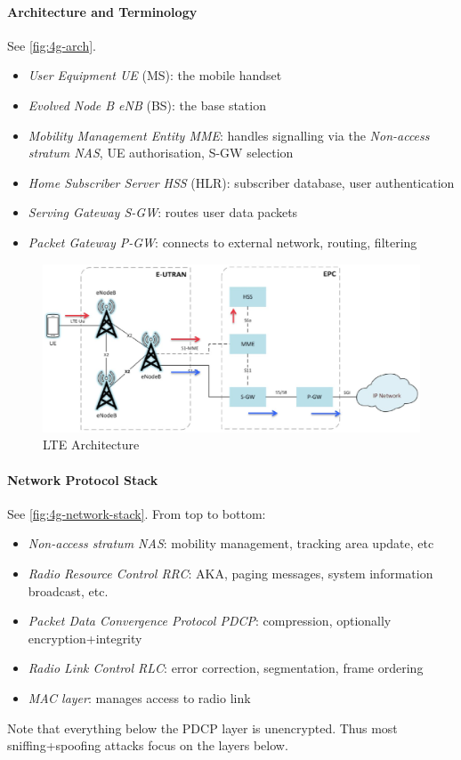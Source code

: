 \paragraph{Architecture and Terminology}
See \autoref{fig:4g-arch}.
\begin{itemize}
	\item \textit{User Equipment UE} (MS): the mobile handset
	\item \textit{Evolved Node B eNB} (BS): the base station
	\item \textit{Mobility Management Entity MME}: handles signalling via the \textit{Non-access stratum NAS}, UE authorisation, S-GW selection
	\item \textit{Home Subscriber Server HSS} (HLR): subscriber database, user authentication
	\item \textit{Serving Gateway S-GW}:  routes user data packets
	\item \textit{Packet Gateway P-GW}: connects to external network, routing, filtering
\end{itemize}

\begin{figure}[h]
	\centering
	\includegraphics[scale=0.5]{images/10-4g-arch.png}
	\caption{LTE Architecture}
	\label{fig:4g-arch}
\end{figure}

\paragraph{Network Protocol Stack}
See \autoref{fig:4g-network-stack}. From top to bottom:
\begin{itemize}
	\item \textit{Non-access stratum NAS}: mobility management, tracking area update, etc
	\item \textit{Radio Resource Control RRC}: AKA, paging messages, system information broadcast, etc.
	\item \textit{Packet Data Convergence Protocol PDCP}: compression, optionally encryption+integrity
	\item \textit{Radio Link Control RLC}: error correction, segmentation, frame ordering
	\item \textit{MAC layer}: manages access to radio link
\end{itemize}
Note that everything below the PDCP layer is unencrypted.
Thus most sniffing+spoofing attacks focus on the layers below.

